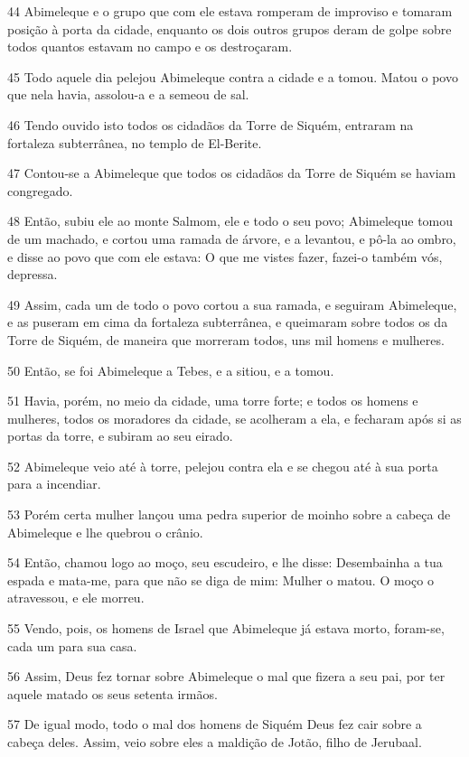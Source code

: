 \par 44 Abimeleque e o grupo que com ele estava romperam de improviso e tomaram posição à porta da cidade, enquanto os dois outros grupos deram de golpe sobre todos quantos estavam no campo e os destroçaram.
\par 45 Todo aquele dia pelejou Abimeleque contra a cidade e a tomou. Matou o povo que nela havia, assolou-a e a semeou de sal.
\par 46 Tendo ouvido isto todos os cidadãos da Torre de Siquém, entraram na fortaleza subterrânea, no templo de El-Berite.
\par 47 Contou-se a Abimeleque que todos os cidadãos da Torre de Siquém se haviam congregado.
\par 48 Então, subiu ele ao monte Salmom, ele e todo o seu povo; Abimeleque tomou de um machado, e cortou uma ramada de árvore, e a levantou, e pô-la ao ombro, e disse ao povo que com ele estava: O que me vistes fazer, fazei-o também vós, depressa.
\par 49 Assim, cada um de todo o povo cortou a sua ramada, e seguiram Abimeleque, e as puseram em cima da fortaleza subterrânea, e queimaram sobre todos os da Torre de Siquém, de maneira que morreram todos, uns mil homens e mulheres.
\par 50 Então, se foi Abimeleque a Tebes, e a sitiou, e a tomou.
\par 51 Havia, porém, no meio da cidade, uma torre forte; e todos os homens e mulheres, todos os moradores da cidade, se acolheram a ela, e fecharam após si as portas da torre, e subiram ao seu eirado.
\par 52 Abimeleque veio até à torre, pelejou contra ela e se chegou até à sua porta para a incendiar.
\par 53 Porém certa mulher lançou uma pedra superior de moinho sobre a cabeça de Abimeleque e lhe quebrou o crânio.
\par 54 Então, chamou logo ao moço, seu escudeiro, e lhe disse: Desembainha a tua espada e mata-me, para que não se diga de mim: Mulher o matou. O moço o atravessou, e ele morreu.
\par 55 Vendo, pois, os homens de Israel que Abimeleque já estava morto, foram-se, cada um para sua casa.
\par 56 Assim, Deus fez tornar sobre Abimeleque o mal que fizera a seu pai, por ter aquele matado os seus setenta irmãos.
\par 57 De igual modo, todo o mal dos homens de Siquém Deus fez cair sobre a cabeça deles. Assim, veio sobre eles a maldição de Jotão, filho de Jerubaal.


